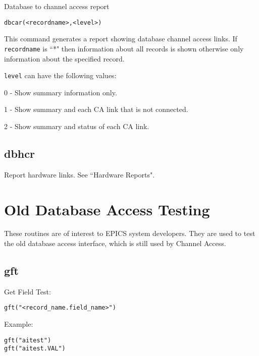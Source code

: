 Database to channel access report

\begin{verbatim}
dbcar(<recordname>,<level>)
\end{verbatim}

This command generates a report showing database channel access links. If \verb|recordname| is ``*" then information about 
all records is shown otherwise only information about the specified record.

\verb|level| can have the following values:

\begin{description}
\item 0 - Show summary information only.

\item 1 - Show summary and each CA link that is not connected.

\item 2 - Show summary and status of each CA link.

\end{description}

\subsection{dbhcr}

Report hardware links. See ``Hardware Reports".

\section{Old Database Access Testing}

These routines are of interest to EPICS system developers. They are used to test the old database access interface, which 
is still used by Channel Access.

\subsection{gft}

Get Field Test:

\begin{verbatim}
gft("<record_name.field_name>")
\end{verbatim}

Example:

\begin{verbatim}
gft("aitest")
gft("aitest.VAL")
\end{verbatim}

